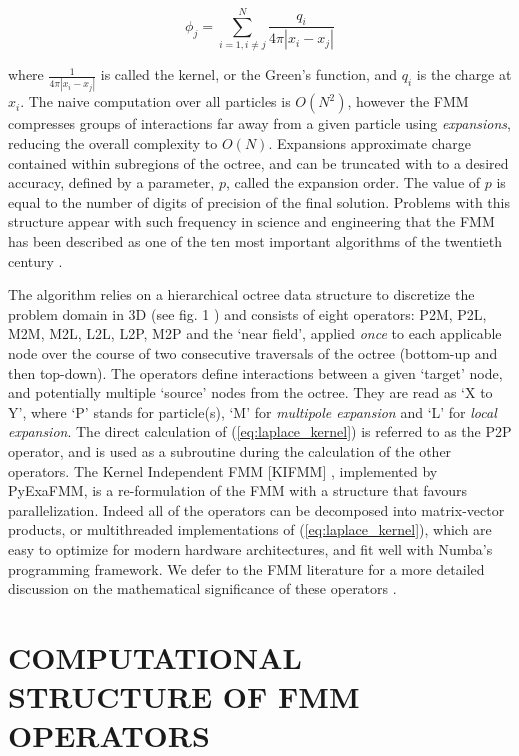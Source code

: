 \documentclass{IEEEcsmag}
\begin{document}
\begin{equation}
    \phi_j = \sum_{i=1, i \neq j}^{N} \frac{q_i}{4 \pi| x_i-x_j |}
    \label{eq:laplace_kernel}
\end{equation}

where $\frac{1}{4 \pi| x_i-x_j|}$ is called the kernel, or the Green's function, and $q_i$ is the charge at $x_i$. The naive computation over all particles is $O(N^2)$, however the FMM compresses groups of interactions far away from a given particle using \textit{expansions}, reducing the overall complexity to $O(N)$. Expansions approximate charge contained within subregions of the octree, and can be truncated with to a desired accuracy, defined by a parameter, $p$, called the expansion order. The value of $p$ is equal to the number of digits of precision of the final solution. Problems with this structure appear with such frequency in science and engineering that the FMM has been described as one of the ten most important algorithms of the twentieth century \cite{Cipra2000}.

The algorithm relies on a hierarchical octree data structure to discretize the problem domain in 3D (see fig. 1 \cite{Sundar2007}) and consists of eight operators: P2M, P2L, M2M, M2L, L2L, L2P, M2P and the `near field', applied \textit{once} to each applicable node over the course of two consecutive traversals of the octree (bottom-up and then top-down). The operators define interactions between a given `target' node, and potentially multiple `source' nodes from the octree. They are read as `X to Y', where `P' stands for particle(s), `M' for \textit{multipole expansion} and `L' for \textit{local expansion}. The direct calculation of (\ref{eq:laplace_kernel}) is referred to as the P2P operator, and is used as a subroutine during the calculation of the other operators. The Kernel Independent FMM [KIFMM] \cite{Ying2004}, implemented by PyExaFMM, is a re-formulation of the FMM with a structure that favours parallelization. Indeed all of the operators can be decomposed into matrix-vector products, or multithreaded implementations of (\ref{eq:laplace_kernel}), which are easy to optimize for modern hardware architectures, and fit well with Numba's programming framework. We defer to the FMM literature for a more detailed discussion on the mathematical significance of these operators \cite{Ying2004,Greengard1987}.

\section{COMPUTATIONAL STRUCTURE OF FMM OPERATORS}
\end{document}
